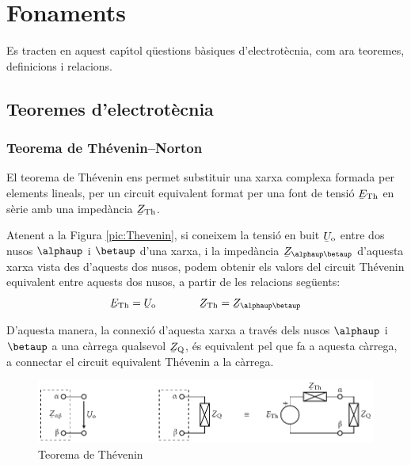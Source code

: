 \chapter{Fonaments}

Es tracten en aquest cap\'{\i}tol q\"{u}estions b\`{a}siques
d'electrot\`{e}cnia, com ara teoremes, definicions i relacions.

\section{Teoremes d'electrot\`{e}cnia}\label{sec:teoremes}

\subsection{\texorpdfstring{Teorema de Th\'{e}venin--Norton}{Teorema de
            Th\'{e}venin-Norton}}\label{sec:T_N}

El teorema de Th\'{e}venin ens permet
substituir una xarxa complexa formada per elements lineals, per un
circuit equivalent format per una font de tensi\'{o} $\cmplx{E}\ped{Th}$
en s\`{e}rie amb una imped\`{a}ncia $\cmplx{Z}\ped{Th}$.

Atenent a la Figura \vref{pic:Thevenin}, si coneixem la tensi\'{o} en
buit $\cmplx{U}\ped{o}$ entre dos nusos $\alphaup$ i $\betaup$ d'una
xarxa, i la imped\`{a}ncia $\cmplx{Z}_{\alphaup\betaup}$ d'aquesta xarxa
vista des d'aquests dos nusos, podem obtenir els valors del circuit
Th\'{e}venin equivalent entre aquests dos nusos, a partir de les
relacions seg\"{u}ents:
\begin{equation}
   \cmplx{E}\ped{Th} = \cmplx{U}\ped{o} \qquad\qquad  \cmplx{Z}\ped{Th} = \cmplx{Z}_{\alphaup\betaup}
\end{equation}

D'aquesta manera, la connexi\'{o} d'aquesta xarxa a trav\'{e}s dels nusos
$\alphaup$ i $\betaup$ a una c\`{a}rrega qualsevol $\cmplx{Z}\ped{Q}$, \'{e}s
equivalent pel que fa a aquesta c\`{a}rrega, a connectar el circuit
equivalent Th\'{e}venin a la c\`{a}rrega.
\begin{figure}[htb]
\centering
    \includegraphics{Imatges/Cap-Fonaments-Thevenin.pdf}
\caption{Teorema de Th\'{e}venin} \label{pic:Thevenin}
\end{figure}

